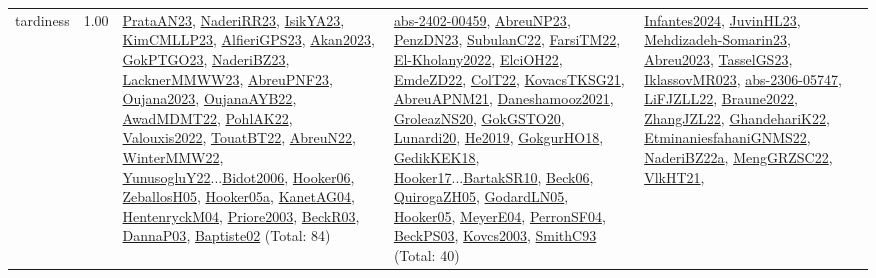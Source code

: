 {\begin{longtable}{p{3cm}r>{\raggedright\arraybackslash}p{6cm}>{\raggedright\arraybackslash}p{6cm}>{\raggedright\arraybackslash}p{8cm}}
\index{tardiness}\index{Concepts!tardiness}tardiness &  1.00 & \hyperref[detail:PrataAN23]{PrataAN23}, \hyperref[detail:NaderiRR23]{NaderiRR23}, \hyperref[detail:IsikYA23]{IsikYA23}, \hyperref[detail:KimCMLLP23]{KimCMLLP23}, \hyperref[detail:AlfieriGPS23]{AlfieriGPS23}, \hyperref[detail:Akan2023]{Akan2023}, \hyperref[detail:GokPTGO23]{GokPTGO23}, \hyperref[detail:NaderiBZ23]{NaderiBZ23}, \hyperref[detail:LacknerMMWW23]{LacknerMMWW23}, \hyperref[detail:AbreuPNF23]{AbreuPNF23}, \hyperref[detail:Oujana2023]{Oujana2023}, \hyperref[detail:OujanaAYB22]{OujanaAYB22}, \hyperref[detail:AwadMDMT22]{AwadMDMT22}, \hyperref[detail:PohlAK22]{PohlAK22}, \hyperref[detail:Valouxis2022]{Valouxis2022}, \hyperref[detail:TouatBT22]{TouatBT22}, \hyperref[detail:AbreuN22]{AbreuN22}, \hyperref[detail:WinterMMW22]{WinterMMW22}, \hyperref[detail:YunusogluY22]{YunusogluY22}...\hyperref[detail:Bidot2006]{Bidot2006}, \hyperref[detail:Hooker06]{Hooker06}, \hyperref[detail:ZeballosH05]{ZeballosH05}, \hyperref[detail:Hooker05a]{Hooker05a}, \hyperref[detail:KanetAG04]{KanetAG04}, \hyperref[detail:HentenryckM04]{HentenryckM04}, \hyperref[detail:Priore2003]{Priore2003}, \hyperref[detail:BeckR03]{BeckR03}, \hyperref[detail:DannaP03]{DannaP03}, \hyperref[detail:Baptiste02]{Baptiste02} (Total: 84) & \hyperref[detail:abs-2402-00459]{abs-2402-00459}, \hyperref[detail:AbreuNP23]{AbreuNP23}, \hyperref[detail:PenzDN23]{PenzDN23}, \hyperref[detail:SubulanC22]{SubulanC22}, \hyperref[detail:FarsiTM22]{FarsiTM22}, \hyperref[detail:El-Kholany2022]{El-Kholany2022}, \hyperref[detail:ElciOH22]{ElciOH22}, \hyperref[detail:EmdeZD22]{EmdeZD22}, \hyperref[detail:ColT22]{ColT22}, \hyperref[detail:KovacsTKSG21]{KovacsTKSG21}, \hyperref[detail:AbreuAPNM21]{AbreuAPNM21}, \hyperref[detail:Daneshamooz2021]{Daneshamooz2021}, \hyperref[detail:GroleazNS20]{GroleazNS20}, \hyperref[detail:GokGSTO20]{GokGSTO20}, \hyperref[detail:Lunardi20]{Lunardi20}, \hyperref[detail:He2019]{He2019}, \hyperref[detail:GokgurHO18]{GokgurHO18}, \hyperref[detail:GedikKEK18]{GedikKEK18}, \hyperref[detail:Hooker17]{Hooker17}...\hyperref[detail:BartakSR10]{BartakSR10}, \hyperref[detail:Beck06]{Beck06}, \hyperref[detail:QuirogaZH05]{QuirogaZH05}, \hyperref[detail:GodardLN05]{GodardLN05}, \hyperref[detail:Hooker05]{Hooker05}, \hyperref[detail:MeyerE04]{MeyerE04}, \hyperref[detail:PerronSF04]{PerronSF04}, \hyperref[detail:BeckPS03]{BeckPS03}, \hyperref[detail:Kovcs2003]{Kovcs2003}, \hyperref[detail:SmithC93]{SmithC93} (Total: 40) & \hyperref[detail:Infantes2024]{Infantes2024}, \hyperref[detail:JuvinHL23]{JuvinHL23}, \hyperref[detail:Mehdizadeh-Somarin23]{Mehdizadeh-Somarin23}, \hyperref[detail:Abreu2023]{Abreu2023}, \hyperref[detail:TasselGS23]{TasselGS23}, \hyperref[detail:IklassovMR023]{IklassovMR023}, \hyperref[detail:abs-2306-05747]{abs-2306-05747}, \hyperref[detail:LiFJZLL22]{LiFJZLL22}, \hyperref[detail:Braune2022]{Braune2022}, \hyperref[detail:ZhangJZL22]{ZhangJZL22}, \hyperref[detail:GhandehariK22]{GhandehariK22}, \hyperref[detail:EtminaniesfahaniGNMS22]{EtminaniesfahaniGNMS22}, \hyperref[detail:NaderiBZ22a]{NaderiBZ22a}, \hyperref[detail:MengGRZSC22]{MengGRZSC22}, \hyperref[detail:VlkHT21]{VlkHT21}, 
\end{longtable}}
